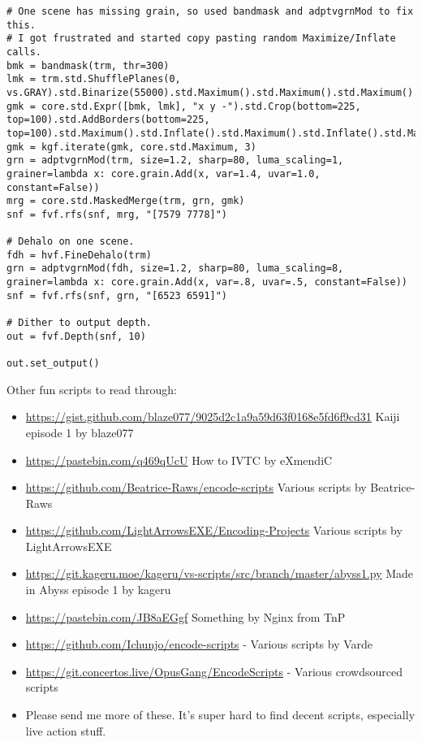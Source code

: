 \documentclass{scrartcl}
\begin{document}
\begin{lstlisting}
# One scene has missing grain, so used bandmask and adptvgrnMod to fix this.
# I got frustrated and started copy pasting random Maximize/Inflate calls.
bmk = bandmask(trm, thr=300)
lmk = trm.std.ShufflePlanes(0, vs.GRAY).std.Binarize(55000).std.Maximum().std.Maximum().std.Maximum().std.Maximum().std.Maximum()
gmk = core.std.Expr([bmk, lmk], "x y -").std.Crop(bottom=225, top=100).std.AddBorders(bottom=225, top=100).std.Maximum().std.Inflate().std.Maximum().std.Inflate().std.Maximum().std.Maximum().std.Maximum().std.Maximum().std.Maximum().std.Maximum().std.Inflate().std.Inflate().std.Inflate().std.Inflate().std.Inflate().std.Inflate().std.Inflate()
gmk = kgf.iterate(gmk, core.std.Maximum, 3)
grn = adptvgrnMod(trm, size=1.2, sharp=80, luma_scaling=1, grainer=lambda x: core.grain.Add(x, var=1.4, uvar=1.0, constant=False))
mrg = core.std.MaskedMerge(trm, grn, gmk)
snf = fvf.rfs(snf, mrg, "[7579 7778]")

# Dehalo on one scene.
fdh = hvf.FineDehalo(trm)
grn = adptvgrnMod(fdh, size=1.2, sharp=80, luma_scaling=8, grainer=lambda x: core.grain.Add(x, var=.8, uvar=.5, constant=False))
snf = fvf.rfs(snf, grn, "[6523 6591]")

# Dither to output depth.
out = fvf.Depth(snf, 10)

out.set_output()
\end{lstlisting}

Other fun scripts to read through:
\begin{itemize}
\item \url{https://gist.github.com/blaze077/9025d2c1a9a59d63f0168e5fd6f9cd31} Kaiji episode 1 by blaze077
\item \url{https://pastebin.com/q469qUcU} How to IVTC by eXmendiC
\item \url{https://github.com/Beatrice-Raws/encode-scripts} Various scripts by Beatrice-Raws
\item \url{https://github.com/LightArrowsEXE/Encoding-Projects} Various scripts by LightArrowsEXE
\item \url{https://git.kageru.moe/kageru/vs-scripts/src/branch/master/abyss1.py} Made in Abyss episode 1 by kageru
\item \url{https://pastebin.com/JB8aEGgf} Something by Nginx from TnP
\item \url{https://github.com/Ichunjo/encode-scripts} - Various scripts by Vard$\ddot{\textrm{e}}$
\item \url{https://git.concertos.live/OpusGang/EncodeScripts} - Various crowdsourced scripts
\item Please send me more of these.  It's super hard to find decent scripts, especially live action stuff.
\end{itemize}
\end{document}
